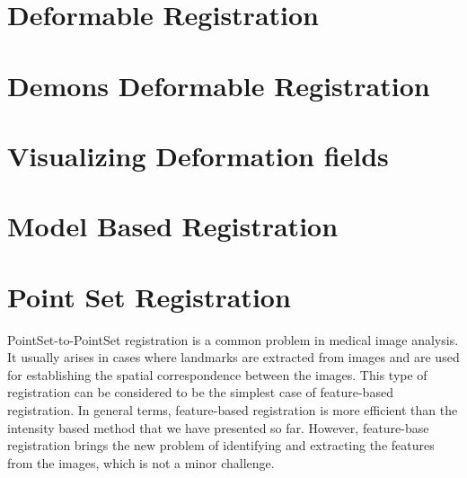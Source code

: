 \clearpage

\section{Deformable Registration}
\label{sec:DeformableRegistration}
\ifitkFullVersion

\fi

\clearpage

\section{Demons Deformable Registration}
\label{sec:DemonsDeformableRegistration}
\ifitkFullVersion

\fi

\section{Visualizing Deformation fields}
\label{sec:VisualizingDeformationFields}
\ifitkFullVersion

\fi

\ifitkFullVersion

\fi


\clearpage



\section{Model Based Registration}
\label{sec:ModelBasedRegistration}
\ifitkFullVersion

\fi


\section{Point Set Registration}
\label{sec:PointSetRegistration}

PointSet-to-PointSet registration is a common problem in medical image
analysis. It usually arises in cases where landmarks are extracted from images
and are used for establishing the spatial correspondence between the images.
This type of registration can be considered to be the simplest case of
feature-based registration. In general terms, feature-based registration is
more efficient than the intensity based method that we have presented so far.
However, feature-base registration brings the new problem of identifying and
extracting the features from the images, which is not a minor challenge. 


